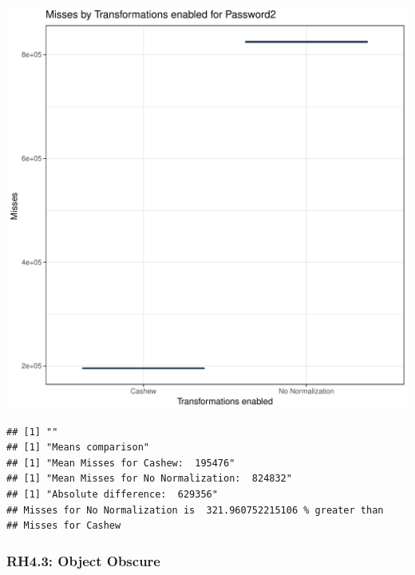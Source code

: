 \documentclass{article}\usepackage[]{graphicx}\usepackage[]{color}
\makeatletter
\def\maxwidth{ %
  \ifdim\Gin@nat@width>\linewidth
    \linewidth
  \else
    \Gin@nat@width
  \fi
}
\newenvironment{kframe}{%
 \def\at@end@of@kframe{}%
 \ifinner\ifhmode%
  \def\at@end@of@kframe{\end{minipage}}%
  \begin{minipage}{\columnwidth}%
 \fi\fi%
 \def\FrameCommand##1{\hskip\@totalleftmargin \hskip-\fboxsep
 \colorbox{shadecolor}{##1}\hskip-\fboxsep
     \hskip-\linewidth \hskip-\@totalleftmargin \hskip\columnwidth}%
 \MakeFramed {\advance\hsize-\width
   \@totalleftmargin\z@ \linewidth\hsize
   \@setminipage}}%
 {\par\unskip\endMakeFramed%
 \at@end@of@kframe}
\newenvironment{knitrout}{}{} %
\makeatother
\begin{document}
\begin{knitrout}
\color{fgcolor}
\includegraphics[width=\maxwidth]{figure/RH4_password2-1} 
\begin{kframe}

{\ttfamily\noindent\bfseries\color{errorcolor}{\#\# Error in eval(expr, envir, enclos): object 'shap\_cashew\_password2' not found}}\begin{verbatim}
## [1] ""
## [1] "Means comparison"
## [1] "Mean Misses for Cashew:  195476"
## [1] "Mean Misses for No Normalization:  824832"
## [1] "Absolute difference:  629356"
## Misses for No Normalization is  321.960752215106 % greater than 
## Misses for Cashew
\end{verbatim}
\end{kframe}
\end{knitrout}


\subsubsection{RH4.3: Object Obscure}
\end{document}
